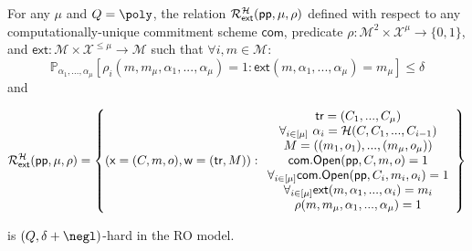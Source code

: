 \begin{lemma}\label{lem:ExtQHard}
For any $\mu$ and $Q = \poly$, the relation $\mathcal{R}^{\mathcal{H}}_\textsf{ext}(\textsf{pp}, \mu, \rho)$ defined with respect to any computationally-unique commitment scheme $\mathsf{com}$, predicate $\rho: \mathcal{M}^2 \times \mathcal{X}^\mu \rightarrow \{0, 1\}$, and $\textsf{ext}: \mathcal{M} \times \mathcal{X}^{\leq \mu} \rightarrow \mathcal{M}$ such that $\forall i, m \in \mathcal{M}$: 
$$\mathbb{P}_{\alpha_1,...,\alpha_{\mu}}[\rho_i(m, m_\mu, \alpha_1,...,\alpha_{\mu}) = 1: \textsf{ext}(m, \alpha_1,...,\alpha_{\mu}) = m_\mu] \leq \delta $$
and 

$$\mathcal{R}^{\mathcal{H}}_\textsf{ext}(\crs, \mu, \rho) = \left\{(\mathsf{x} = (C, m, o), \mathsf{w} = (\tr, M)): \begin{array}{c} \tr = (C_1,...,C_\mu) \\ \forall_{i \in [\mu]} \ \alpha_i = \mathcal{H}(C, C_1,...,C_{i-1}) \\ M = ((m_1,o_1),...,(m_\mu, o_\mu)) \\ \textsf{com}.\open(\crs, C, m, o) = 1 \\ \forall_{i \in [\mu]} \textsf{com}.\open(\crs,C_i, m_i, o_i) = 1 \\ \forall_{i \in [\mu]}\textsf{ext}(m, \alpha_1,...,\alpha_{i}) = m_i \\ \rho(m, m_\mu, \alpha_1,...,\alpha_\mu) = 1  \end{array} \right\} $$ 
	
is $(Q, \delta + \negl)$-hard in the RO model. 

\end{lemma}

